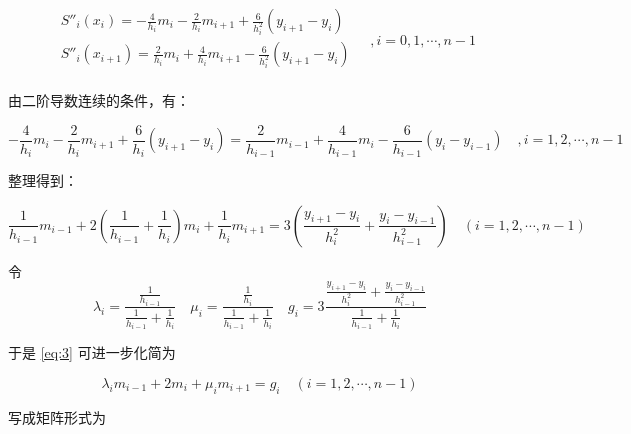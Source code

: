 \documentclass{ctexart}
\numberwithin{equation}{section}
\begin{document}
\begin{equation}
    \begin{aligned}
    &S''_i(x_i) = -\frac{4}{h_i}m_i-\frac{2}{h_i}m_{i+1}+\frac{6}{h^2_i}(y_{i+1}-y_i)\\
    &S''_i(x_{i+1}) = \frac{2}{h_i}m_i+\frac{4}{h_i}m_{i+1}-\frac{6}{h^2_i}(y_{i+1}-y_i)\\
    \end{aligned}
    \quad,i = 0,1,\cdots,n-1
\end{equation}

由二阶导数连续的条件，有：

\begin{equation*}
    -\frac{4}{h_i}m_i-\frac{2}{h_i}m_{i+1}+\frac{6}{h_i}(y_{i+1}-y_i)
    = \frac{2}{h_{i-1}}m_{i-1}+\frac{4}{h_{i-1}}m_{i}-\frac{6}{h_{i-1}}(y_{i}-y_{i-1}) \quad,i = 1,2,\cdots,n-1
   \end{equation*}

整理得到：

\begin{equation}
    \frac{1}{h_{i-1}} m_{i-1}+2\left(\frac{1}{h_{i-1}}+\frac{1}{h_{i}}\right) m_{i}+\frac{1}{h_{i}} m_{i+1} =3\left(\frac{y_{i+1}-y_{i}}{h_{i}^{2}}+\frac{y_{i}-y_{i-1}}{h_{i-1}^{2}}\right) \quad(i=1,2,\cdots, n-1)
    \label{eq:3}
\end{equation}

令 
\begin{equation}
    \lambda_i = \dfrac{\frac{1}{h_{i-1}}}{\frac{1}{h_{i-1}}+\frac{1}{h_i}} \quad
    \mu_i = \dfrac{\frac{1}{h_i}}{\frac{1}{h_{i-1}}+\frac{1}{h_i}} \quad
    g_i = 3\dfrac{\frac{y_{i+1}-y_{i}}{h_{i}^{2}}+\frac{y_{i}-y_{i-1}}{h_{i-1}^{2}}}{\frac{1}{h_{i-1}}+\frac{1}{h_i}}
    \label{eq:7}
\end{equation}

于是 \eqref{eq:3} 可进一步化简为

\begin{equation}
    \lambda_i m_{i-1}+2m_i+\mu_i m_{i+1} = g_i\quad(i=1,2,\cdots, n-1)
\end{equation}

写成矩阵形式为
\end{document}
